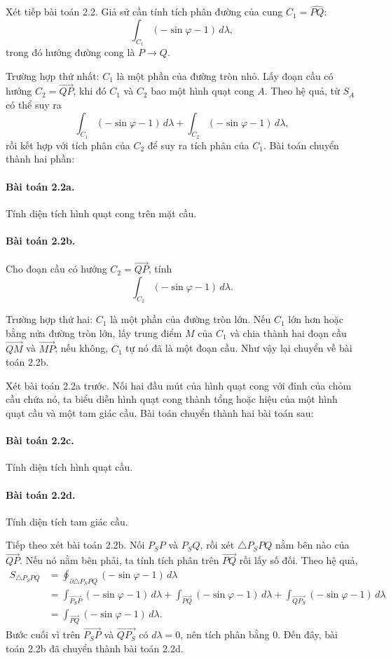 \documentclass[11pt]{article}
\begin{document}
Xét tiếp bài toán 2.2. Giả sử cần tính tích phân đường của cung
\(C_1=\widehat{PQ}\):
\[
  \int_{C_1}(-\sin\varphi-1)\,d\lambda,
\]
trong đó hướng đường cong là \(P\to Q\).

Trường hợp thứ nhất: \(C_1\) là một phần của đường tròn nhỏ. Lấy đoạn cầu có
hướng \(C_2=\overrightarrow{QP}\), khi đó \(C_1\) và \(C_2\) bao một hình quạt
cong \(A\). Theo hệ quả, từ \(S_A\) có thể suy ra
\[
  \int_{C_1}(-\sin\varphi-1)\,d\lambda
  +
  \int_{C_2}(-\sin\varphi-1)\,d\lambda,
\]
rồi kết hợp với tích phân của \(C_2\) để suy ra tích phân của \(C_1\). Bài toán
chuyển thành hai phần:

\paragraph{Bài toán 2.2a.}
Tính diện tích hình quạt cong trên mặt cầu.

\paragraph{Bài toán 2.2b.}
Cho đoạn cầu có hướng \(C_2=\overrightarrow{QP}\), tính
\[
  \int_{C_2}(-\sin\varphi-1)\,d\lambda.
\]

Trường hợp thứ hai: \(C_1\) là một phần của đường tròn lớn. Nếu \(C_1\) lớn hơn
hoặc bằng nửa đường tròn lớn, lấy trung điểm \(M\) của \(C_1\) và chia thành hai
đoạn cầu \(\overrightarrow{QM}\) và \(\overrightarrow{MP}\); nếu không,
\(C_1\) tự nó đã là một đoạn cầu. Như vậy lại chuyển về bài toán 2.2b.

Xét bài toán 2.2a trước. Nối hai đầu mút của hình quạt cong với đỉnh của chỏm
cầu chứa nó, ta biểu diễn hình quạt cong thành tổng hoặc hiệu của một hình quạt
cầu và một tam giác cầu. Bài toán chuyển thành hai bài toán sau:

\paragraph{Bài toán 2.2c.}
Tính diện tích hình quạt cầu.

\paragraph{Bài toán 2.2d.}
Tính diện tích tam giác cầu.

Tiếp theo xét bài toán 2.2b. Nối \(P_SP\) và \(P_SQ\), rồi xét
\(\triangle P_SPQ\) nằm bên nào của \(\overrightarrow{QP}\). Nếu nó nằm bên
phải, ta tính tích phân trên \(\overrightarrow{PQ}\) rồi lấy số đối. Theo hệ
quả,
\[
\begin{aligned}
  S_{\triangle P_SPQ}
  &=
  \oint_{\partial\triangle P_SPQ}(-\sin\varphi-1)\,d\lambda\\
  &=
  \int_{\overrightarrow{P_SP}}(-\sin\varphi-1)\,d\lambda
  +\int_{\overrightarrow{PQ}}(-\sin\varphi-1)\,d\lambda
  +\int_{\overrightarrow{QP_S}}(-\sin\varphi-1)\,d\lambda\\
  &=
  \int_{\overrightarrow{PQ}}(-\sin\varphi-1)\,d\lambda.
\end{aligned}
\]
Bước cuối vì trên \(\overrightarrow{P_SP}\) và \(\overrightarrow{QP_S}\) có
\(d\lambda=0\), nên tích phân bằng \(0\). Đến đây, bài toán 2.2b đã chuyển
thành bài toán 2.2d.
\end{document}
